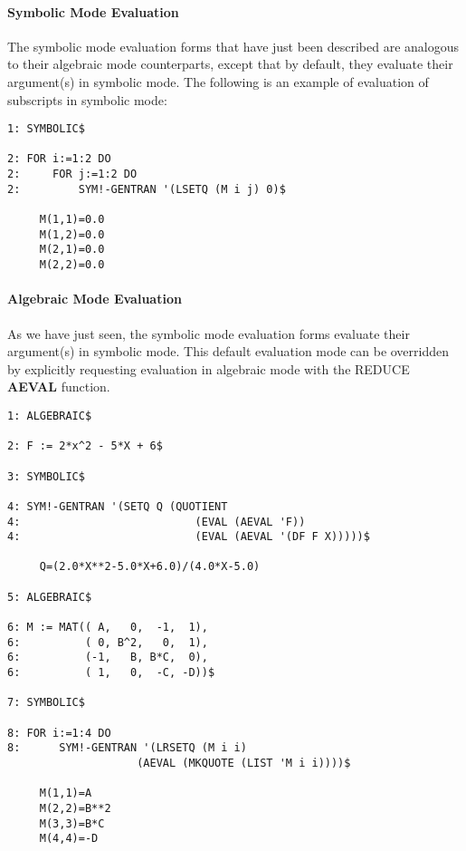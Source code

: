 \paragraph{Symbolic Mode Evaluation}
\label{lispeval}
The symbolic mode evaluation forms that have just been described are
analogous to their algebraic mode counterparts, except that
by default, they evaluate their argument(s) in symbolic mode.  The
following is an example of evaluation of subscripts in symbolic mode:
\begin{describe}{\example}
\begin{verbatim}
1: SYMBOLIC$

2: FOR i:=1:2 DO 
2:     FOR j:=1:2 DO 
2:         SYM!-GENTRAN '(LSETQ (M i j) 0)$

     M(1,1)=0.0
     M(1,2)=0.0
     M(2,1)=0.0
     M(2,2)=0.0
\end{verbatim}
\end{describe} 

\paragraph{Algebraic Mode Evaluation}
As we have just seen, the symbolic mode evaluation forms evaluate their
argument(s) in symbolic mode.  This default evaluation mode can be
overridden by explicitly requesting evaluation in algebraic mode with
the REDUCE {\bf AEVAL} function.

\begin{describe}{\example}
\begin{verbatim}
1: ALGEBRAIC$

2: F := 2*x^2 - 5*X + 6$ 

3: SYMBOLIC$ 

4: SYM!-GENTRAN '(SETQ Q (QUOTIENT 
4:                           (EVAL (AEVAL 'F)) 
4:                           (EVAL (AEVAL '(DF F X)))))$

     Q=(2.0*X**2-5.0*X+6.0)/(4.0*X-5.0)

5: ALGEBRAIC$ 

6: M := MAT(( A,   0,  -1,  1), 
6:          ( 0, B^2,   0,  1), 
6:          (-1,   B, B*C,  0), 
6:          ( 1,   0,  -C, -D))$ 

7: SYMBOLIC$ 

8: FOR i:=1:4 DO 
8:      SYM!-GENTRAN '(LRSETQ (M i i) 
                    (AEVAL (MKQUOTE (LIST 'M i i))))$

     M(1,1)=A
     M(2,2)=B**2
     M(3,3)=B*C
     M(4,4)=-D
\end{verbatim}
\end{describe}

